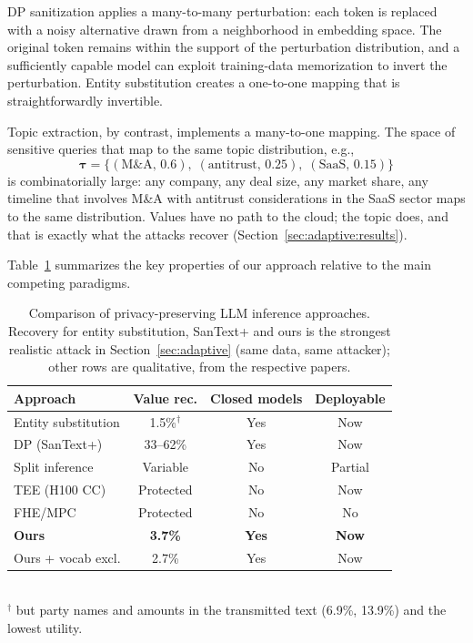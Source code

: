 \documentclass[sigconf,balance=false]{acmart}
\begin{document}
DP sanitization applies a many-to-many perturbation: each token is replaced with a noisy alternative drawn from a neighborhood in embedding space. The original token remains within the support of the perturbation distribution, and a sufficiently capable model can exploit training-data memorization to invert the perturbation. Entity substitution creates a one-to-one mapping that is straightforwardly invertible.

Topic extraction, by contrast, implements a many-to-one mapping. The space of sensitive queries that map to the same topic distribution, e.g.,
\[
\boldsymbol{\tau} = \bigl\{(\text{M\&A},\, 0.6),\; (\text{antitrust},\, 0.25),\; (\text{SaaS},\, 0.15)\bigr\}
\]
is combinatorially large: any company, any deal size, any market share, any timeline that involves M\&A with antitrust considerations in the SaaS sector maps to the same distribution. Values have no path to the cloud; the topic does, and that is exactly what the attacks recover (Section~\ref{sec:adaptive:results}).

Table~\ref{tab:comparison} summarizes the key properties of our approach relative to the main competing paradigms.

\begin{table}[t]
\caption{Comparison of privacy-preserving LLM inference approaches. Recovery for entity substitution, SanText+ and ours is the strongest realistic attack in Section~\ref{sec:adaptive} (same data, same attacker); other rows are qualitative, from the respective papers.}
\label{tab:comparison}
\small
\begin{tabular}{@{}lccc@{}}
\toprule
\textbf{Approach} & \textbf{Value rec.} & \textbf{Closed models} & \textbf{Deployable} \\
\midrule
Entity substitution & 1.5\%$^\dagger$ & Yes & Now \\
DP (SanText+) & 33--62\% & Yes & Now \\
Split inference & Variable & No & Partial \\
TEE (H100 CC) & Protected & No & Now \\
FHE/MPC & Protected & No & No \\
\textbf{Ours} & \textbf{3.7\%} & \textbf{Yes} & \textbf{Now} \\
Ours + vocab excl. & 2.7\% & Yes & Now \\
\bottomrule
\end{tabular}
\\[2pt]{\footnotesize $^\dagger$ but party names and amounts in the transmitted text (6.9\%, 13.9\%) and the lowest utility.}
\end{table}
\end{document}
